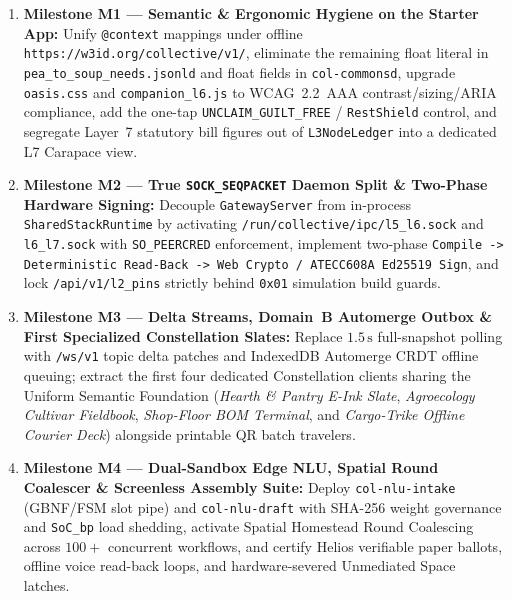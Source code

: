 \begin{enumerate}
    \item \textbf{Milestone M1 --- Semantic \& Ergonomic Hygiene on the Starter App:} Unify \texttt{@context} mappings under offline \texttt{https://w3id.org/collective/v1/}, eliminate the remaining float literal in \texttt{pea\_to\_soup\_needs.jsonld} and float fields in \texttt{col-commonsd}, upgrade \texttt{oasis.css} and \texttt{companion\_l6.js} to WCAG~2.2~AAA contrast/sizing/ARIA compliance, add the one-tap \texttt{UNCLAIM\_GUILT\_FREE} / \texttt{RestShield} control, and segregate Layer~7 statutory bill figures out of \texttt{L3NodeLedger} into a dedicated L7 Carapace view.
    \item \textbf{Milestone M2 --- True \texttt{SOCK\_SEQPACKET} Daemon Split \& Two-Phase Hardware Signing:} Decouple \texttt{GatewayServer} from in-process \texttt{SharedStackRuntime} by activating \texttt{/run/collective/ipc/l5\_l6.sock} and \texttt{l6\_l7.sock} with \texttt{SO\_PEERCRED} enforcement, implement two-phase \texttt{Compile -> Deterministic Read-Back -> Web Crypto / ATECC608A Ed25519 Sign}, and lock \texttt{/api/v1/l2\_pins} strictly behind \texttt{0x01} simulation build guards.
    \item \textbf{Milestone M3 --- Delta Streams, Domain~B Automerge Outbox \& First Specialized Constellation Slates:} Replace $1.5\,\mathrm{s}$ full-snapshot polling with \texttt{/ws/v1} topic delta patches and IndexedDB Automerge CRDT offline queuing; extract the first four dedicated Constellation clients sharing the Uniform Semantic Foundation (\textit{Hearth \& Pantry E-Ink Slate}, \textit{Agroecology Cultivar Fieldbook}, \textit{Shop-Floor BOM Terminal}, and \textit{Cargo-Trike Offline Courier Deck}) alongside printable QR batch travelers.
    \item \textbf{Milestone M4 --- Dual-Sandbox Edge NLU, Spatial Round Coalescer \& Screenless Assembly Suite:} Deploy \texttt{col-nlu-intake} (GBNF/FSM slot pipe) and \texttt{col-nlu-draft} with SHA-256 weight governance and \texttt{SoC\_bp} load shedding, activate Spatial Homestead Round Coalescing across $100+$ concurrent workflows, and certify Helios verifiable paper ballots, offline voice read-back loops, and hardware-severed Unmediated Space latches.
\end{enumerate}

